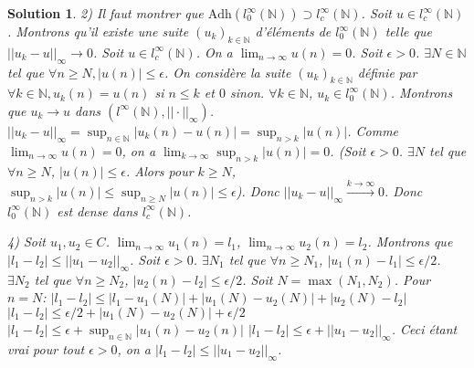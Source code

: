 \documentclass{article}
\newtheorem{solution}{Solution}
\begin{document}
\begin{solution}
2) Il faut montrer que $\text{Adh}(l_0^\infty(\mathbb{N})) \supset l_c^\infty(\mathbb{N})$.
Soit $u \in l_c^\infty(\mathbb{N})$. Montrons qu'il existe une suite $(u_k)_{k \in \mathbb{N}}$ d'éléments de $l_0^\infty(\mathbb{N})$ telle que $||u_k - u||_\infty \to 0$.
Soit $u \in l_c^\infty(\mathbb{N})$. On a $\lim_{n \to \infty} u(n) = 0$.
Soit $\epsilon > 0$. $\exists N \in \mathbb{N}$ tel que $\forall n \ge N, |u(n)| \le \epsilon$.
On considère la suite $(u_k)_{k \in \mathbb{N}}$ définie par $\forall k \in \mathbb{N}, u_k(n) = u(n)$ si $n \le k$ et $0$ sinon.
$\forall k \in \mathbb{N}$, $u_k \in l_0^\infty(\mathbb{N})$.
Montrons que $u_k \to u$ dans $(l^\infty(\mathbb{N}), ||\cdot||_\infty)$.
$||u_k - u||_\infty = \sup_{n \in \mathbb{N}} |u_k(n) - u(n)| = \sup_{n > k} |u(n)|$.
Comme $\lim_{n \to \infty} u(n) = 0$, on a $\lim_{k \to \infty} \sup_{n > k} |u(n)| = 0$.
(Soit $\epsilon > 0$. $\exists N$ tel que $\forall n \ge N$, $|u(n)| \le \epsilon$.
Alors pour $k \ge N$, $\sup_{n > k} |u(n)| \le \sup_{n \ge N} |u(n)| \le \epsilon$).
Donc $||u_k - u||_\infty \xrightarrow{k \to \infty} 0$.
Donc $l_0^\infty(\mathbb{N})$ est dense dans $l_c^\infty(\mathbb{N})$.

4) Soit $u_1, u_2 \in C$. $\lim_{n \to \infty} u_1(n) = l_1$, $\lim_{n \to \infty} u_2(n) = l_2$.
Montrons que $|l_1 - l_2| \le ||u_1 - u_2||_\infty$.
Soit $\epsilon > 0$.
$\exists N_1$ tel que $\forall n \ge N_1$, $|u_1(n) - l_1| \le \epsilon/2$.
$\exists N_2$ tel que $\forall n \ge N_2$, $|u_2(n) - l_2| \le \epsilon/2$.
Soit $N = \max(N_1, N_2)$. Pour $n=N$:
$|l_1 - l_2| \le |l_1 - u_1(N)| + |u_1(N) - u_2(N)| + |u_2(N) - l_2|$
$|l_1 - l_2| \le \epsilon/2 + |u_1(N) - u_2(N)| + \epsilon/2$
$|l_1 - l_2| \le \epsilon + \sup_{n \in \mathbb{N}} |u_1(n) - u_2(n)|$
$|l_1 - l_2| \le \epsilon + ||u_1 - u_2||_\infty$.
Ceci étant vrai pour tout $\epsilon > 0$, on a $|l_1 - l_2| \le ||u_1 - u_2||_\infty$.


\end{solution}
\end{document}
